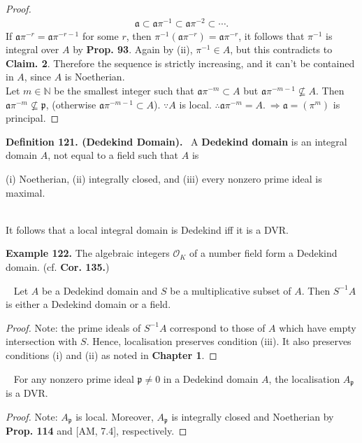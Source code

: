 \documentclass[12pt,a4paper,footinclude=true,headinclude=true]{scrbook} %
\newenvironment{proposition}[2][]
{\renewcommand\theinnercustomprop{#2}\innercustomprop[#1] 
\begin{mdframed}[backgroundcolor=gray!20]\ }
{\end{mdframed}\endinnercustomprop}
\newenvironment{definition}[2][Definition]
    { \begin{mdframed}[backgroundcolor=gray!20] \textbf{#1 #2.}\ }
    {  \end{mdframed}}
\newenvironment{example}[2][Example]
    { \begin{mdframed}[backgroundcolor=gray!20] \textbf{#1 #2.} }
    {  \end{mdframed}}
\begin{document}
\begin{proof}
    \begin{align*}
        \mathfrak{a}\subset\mathfrak{a}\pi^{-1} \subset\mathfrak{a}\pi^{-2}\subset\cdots.
    \end{align*}
    If $\mathfrak{a}\pi^{-r}=\mathfrak{a}\pi^{-r-1}$ for some $r$, then $\pi^{-1}(\mathfrak{a}\pi^{-r})=\mathfrak{a}\pi^{-r}$, it follows that $\pi^{-1}$ is integral over $A$ by \textbf{Prop. 93}. Again by (ii), $\pi^{-1}\in A$, but this contradicts to \textbf{Claim. 2}. Therefore the sequence is strictly increasing, and it can't be contained in $A$, since $A$ is Noetherian.\\
    Let $m\in\mathbb{N}$ be the smallest integer such that $\mathfrak{a}\pi^{-m}\subset A$ but $\mathfrak{a}\pi^{-m-1} \nsubseteq A$. Then  $\mathfrak{a}\pi^{-m}\nsubseteq\mathfrak{p}$, (otherwise  $\mathfrak{a}\pi^{-m-1}\subset A$). $\because A$ is local. $\therefore\mathfrak{a}\pi^{-m}=A.\ \Rightarrow \mathfrak{a} =(\pi^m)$ is principal.
\end{proof}

\begin{definition}{121. (Dedekind Domain)}
    A \textbf{Dedekind domain} is an integral domain $A$, not equal to a field such that $A$ is \\ \centerline{(i) Noetherian, (ii) integrally closed, and (iii)  every nonzero prime ideal is maximal.}\\
    It follows that a local integral domain is Dedekind iff it is a DVR.
\end{definition}

\begin{example}{122}
    The algebraic integers $\mathcal{O}_K$ of a number field form a Dedekind domain. (cf. \textbf{Cor. 135.})
\end{example}

\begin{proposition}{123}
    Let $A$ be a Dedekind domain and $S$ be a multiplicative subset of $A$. Then $S^{-1}A$ is either a Dedekind domain or a field.
\end{proposition}
\begin{proof}
    Note: the prime ideals of $S^{-1}A$ correspond to those of $A$ which have empty intersection with $S$. Hence, localisation preserves condition (iii). It also preserves conditions (i) and (ii) as noted in \textbf{Chapter 1}.
\end{proof}

\begin{proposition}{124}
    For any nonzero prime ideal $\mathfrak{p}\neq0$ in a Dedekind domain $A$, the localisation $A_\mathfrak{p}$ is a DVR.
\end{proposition}
\begin{proof}
    Note: $A_\mathfrak{p}$ is local. Moreover, $A_\mathfrak{p}$ is integrally closed and Noetherian by \textbf{Prop. 114} and [AM, 7.4], respectively.
\end{proof}
\end{document}
